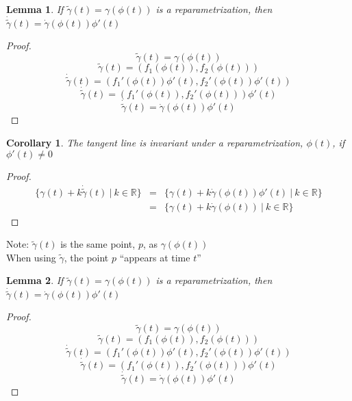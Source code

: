 \documentclass[twocolumn,20pt,fleqn]{extarticle}
\theoremstyle{plain}
\newtheorem*{lemma}{Lemma}
\newtheorem*{corollary}{Corollary}
\theoremstyle{definition}
\theoremstyle{remark}
\begin{document}
\clearpage



\begin{lemma}
If $\tilde{\gamma}(t) = \gamma(\phi(t))$ is a reparametrization, then $\dot{\tilde{\gamma}}(t) = \dot{\gamma}(\phi(t))\phi'(t)$
\end{lemma}
\begin{proof}
\[\tilde{\gamma}(t) = \gamma(\phi(t))\]
\[\tilde{\gamma}(t) = (f_1(\phi(t)), f_2(\phi(t)))\]
\[\dot{\tilde{\gamma}}(t) = (f_1'(\phi(t))\phi'(t), f_2'(\phi(t))\phi'(t))\]
\[\dot{\tilde{\gamma}}(t) = (f_1'(\phi(t)), f_2'(\phi(t)))\phi'(t)\]
\[\dot{\tilde{\gamma}}(t) = \dot{\gamma}(\phi(t))\phi'(t)\]
\end{proof}

\begin{corollary}
The tangent line is invariant under a reparametrization, $\phi(t)$,  if $\phi'(t)\neq 0$ 
\end{corollary}
\begin{proof}
\begin{eqnarray*}
\{\gamma(t) + k\dot{\tilde{\gamma}}(t) \ |\ k\in \mathbb{R}\} &=& \{\gamma(t) + k\dot{\gamma}(\phi(t))\phi'(t) \ |\ k\in \mathbb{R}\} \\ 
                                                  &=& \{\gamma(t) + k\dot{\gamma}(\phi(t)) \ |\ k\in \mathbb{R}\}
\end{eqnarray*}
\end{proof}
\newpage
Note: $\tilde{\gamma}(t)$ is the same point, $p$, as $\gamma(\phi(t))$\\
When using $\tilde{\gamma}$, the point $p$ ``appears at time $t$''


\clearpage



\begin{lemma}
If $\tilde{\gamma}(t) = \gamma(\phi(t))$ is a reparametrization, then $\dot{\tilde{\gamma}}(t) = \dot{\gamma}(\phi(t))\phi'(t)$
\end{lemma}
\begin{proof}
\[\tilde{\gamma}(t) = \gamma(\phi(t))\]
\[\tilde{\gamma}(t) = (f_1(\phi(t)), f_2(\phi(t)))\]
\[\dot{\tilde{\gamma}}(t) = (f_1'(\phi(t))\phi'(t), f_2'(\phi(t))\phi'(t))\]
\[\dot{\tilde{\gamma}}(t) = (f_1'(\phi(t)), f_2'(\phi(t)))\phi'(t)\]
\[\dot{\tilde{\gamma}}(t) = \dot{\gamma}(\phi(t))\phi'(t)\]
\end{proof}
\end{document}
